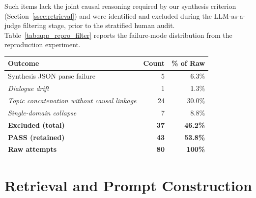 \documentclass[a4paper,fleql]{cas-sc}
\begin{document}
Such items lack the joint causal reasoning required by our synthesis
criterion (Section~\ref{ssec:retrieval}) and were identified and excluded
during the LLM-as-a-judge filtering stage, prior to the stratified human
audit.
Table~\ref{tab:app_repro_filter} reports the failure-mode distribution
from the reproduction experiment.

\vspace{6pt plus 4pt minus 3pt}
\begin{center}
\begingroup
{}
\label{tab:app_repro_filter}
\renewcommand{\arraystretch}{1.3}
\begin{tabular}{lrr}
\toprule
\textbf{Outcome} & \textbf{Count} & \textbf{\% of Raw} \\
\midrule
Synthesis JSON parse failure        &  5 &  6.3\% \\
\textit{Dialogue drift}             &  1 &  1.3\% \\
\textit{Topic concatenation without causal linkage} & 24 & 30.0\% \\
\textit{Single-domain collapse}     &  7 &  8.8\% \\
\midrule
\textbf{Excluded (total)}           & \textbf{37} & \textbf{46.2\%} \\
\midrule
\textbf{PASS (retained)}            & \textbf{43} & \textbf{53.8\%} \\
\midrule
\textbf{Raw attempts}               & \textbf{80} & \textbf{100\%} \\
\bottomrule
\end{tabular}
\endgroup
\end{center}
\vspace{6pt plus 4pt minus 3pt}

\section{Retrieval and Prompt Construction}
\label{app:prompts}
\end{document}

